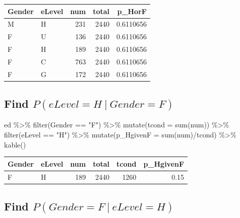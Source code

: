 \documentclass[
  letterpaper,
]{book}
\newenvironment{Shaded}{\begin{snugshade}}{\end{snugshade}}
\newcommand{\AttributeTok}[1]{\textcolor[rgb]{0.40,0.45,0.13}{#1}}
\newcommand{\FunctionTok}[1]{\textcolor[rgb]{0.28,0.35,0.67}{#1}}
\newcommand{\NormalTok}[1]{\textcolor[rgb]{0.00,0.23,0.31}{#1}}
\newcommand{\SpecialCharTok}[1]{\textcolor[rgb]{0.37,0.37,0.37}{#1}}
\newcommand{\StringTok}[1]{\textcolor[rgb]{0.13,0.47,0.30}{#1}}
\begin{document}
\begin{longtable}[]{@{}llrrr@{}}
\toprule()
Gender & eLevel & num & total & p\_HorF \\
\midrule()
\endhead
M & H & 231 & 2440 & 0.6110656 \\
F & U & 136 & 2440 & 0.6110656 \\
F & H & 189 & 2440 & 0.6110656 \\
F & C & 763 & 2440 & 0.6110656 \\
F & G & 172 & 2440 & 0.6110656 \\
\bottomrule()
\end{longtable}

\hypertarget{find-pelevel-h-gender-f}{%
\subsection{\texorpdfstring{Find
\(P(eLevel = H\ |\ Gender = F)\)}{Find P(eLevel = H\textbackslash{} \textbar\textbackslash{} Gender = F)}}\label{find-pelevel-h-gender-f}}

\begin{Shaded}
\begin{Highlighting}[]
\NormalTok{ed }\SpecialCharTok{\%\textgreater{}\%}
  \FunctionTok{filter}\NormalTok{(Gender }\SpecialCharTok{==} \StringTok{"F"}\NormalTok{) }\SpecialCharTok{\%\textgreater{}\%}
  \FunctionTok{mutate}\NormalTok{(}\AttributeTok{tcond =} \FunctionTok{sum}\NormalTok{(num)) }\SpecialCharTok{\%\textgreater{}\%} 
  \FunctionTok{filter}\NormalTok{(eLevel }\SpecialCharTok{==} \StringTok{"H"}\NormalTok{) }\SpecialCharTok{\%\textgreater{}\%}
  \FunctionTok{mutate}\NormalTok{(}\AttributeTok{p\_HgivenF =} \FunctionTok{sum}\NormalTok{(num)}\SpecialCharTok{/}\NormalTok{tcond) }\SpecialCharTok{\%\textgreater{}\%}
  \FunctionTok{kable}\NormalTok{()}
\end{Highlighting}
\end{Shaded}

\begin{longtable}[]{@{}llrrrr@{}}
\toprule()
Gender & eLevel & num & total & tcond & p\_HgivenF \\
\midrule()
\endhead
F & H & 189 & 2440 & 1260 & 0.15 \\
\bottomrule()
\end{longtable}

\hypertarget{find-pgender-f-elevel-h}{%
\subsection{\texorpdfstring{Find
\(P(Gender = F\ | \ eLevel = H)\)}{Find P(Gender = F\textbackslash{} \textbar{} \textbackslash{} eLevel = H)}}\label{find-pgender-f-elevel-h}}
\end{document}
